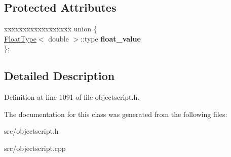 \subsection*{Protected Attributes}
\begin{DoxyCompactItemize}
\item 
\begin{tabbing}
xx\=xx\=xx\=xx\=xx\=xx\=xx\=xx\=xx\=\kill
union \{\\
\>\hyperlink{struct_object_script_1_1_float_type}{FloatType}$<$ double $>$::type {\bfseries float\_value}\\
\}; \hypertarget{class_object_script_1_1_o_s_1_1_core_1_1_tokenizer_1_1_token_data_af353f0623fce3e4ce7451a0beae0ddcf}{}\label{class_object_script_1_1_o_s_1_1_core_1_1_tokenizer_1_1_token_data_af353f0623fce3e4ce7451a0beae0ddcf}
\\

\end{tabbing}\end{DoxyCompactItemize}


\subsection{Detailed Description}


Definition at line 1091 of file objectscript.\+h.



The documentation for this class was generated from the following files\+:\begin{DoxyCompactItemize}
\item 
src/objectscript.\+h\item 
src/objectscript.\+cpp\end{DoxyCompactItemize}
